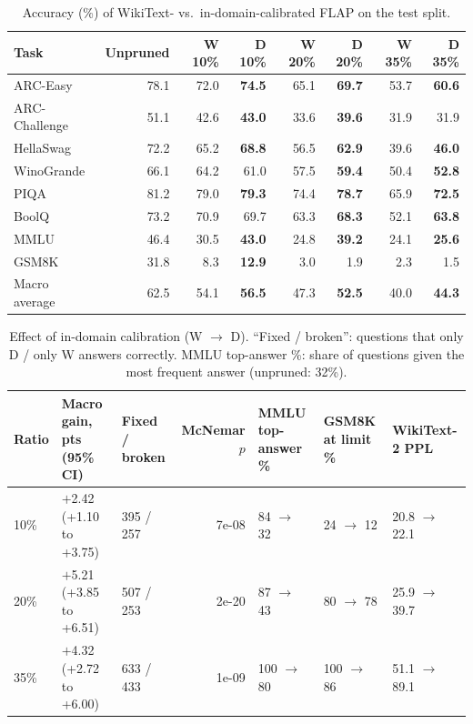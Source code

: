 \begin{table}[!htbp]\centering\small
\begin{tabular}{lrrrrrrr}
\toprule
Task & Unpruned & W 10\% & D 10\% & W 20\% & D 20\% & W 35\% & D 35\% \\
\midrule
ARC-Easy & 78.1 & 72.0 & \textbf{74.5} & 65.1 & \textbf{69.7} & 53.7 & \textbf{60.6} \\
ARC-Challenge & 51.1 & 42.6 & \textbf{43.0} & 33.6 & \textbf{39.6} & 31.9 & 31.9 \\
HellaSwag & 72.2 & 65.2 & \textbf{68.8} & 56.5 & \textbf{62.9} & 39.6 & \textbf{46.0} \\
WinoGrande & 66.1 & 64.2 & 61.0 & 57.5 & \textbf{59.4} & 50.4 & \textbf{52.8} \\
PIQA & 81.2 & 79.0 & \textbf{79.3} & 74.4 & \textbf{78.7} & 65.9 & \textbf{72.5} \\
BoolQ & 73.2 & 70.9 & 69.7 & 63.3 & \textbf{68.3} & 52.1 & \textbf{63.8} \\
MMLU & 46.4 & 30.5 & \textbf{43.0} & 24.8 & \textbf{39.2} & 24.1 & \textbf{25.6} \\
GSM8K & 31.8 & 8.3 & \textbf{12.9} & 3.0 & 1.9 & 2.3 & 1.5 \\
\midrule
Macro average & 62.5 & 54.1 & \textbf{56.5} & 47.3 & \textbf{52.5} & 40.0 & \textbf{44.3} \\
\bottomrule
\end{tabular}
\caption{Accuracy (\%) of WikiText- vs.\ in-domain-calibrated FLAP on the test split.}\label{tab:calib}
\end{table}

\begin{table}[!htbp]\centering\small
\begin{tabular}{lllrlll}
\toprule
Ratio & Macro gain, pts (95\% CI) & Fixed / broken & McNemar $p$ & MMLU top-answer \% & GSM8K at limit \% & WikiText-2 PPL \\
\midrule
10\% & $+$2.42 (+1.10 to +3.75) & 395 / 257 & 7e-08 & 84 $\to$ 32 & 24 $\to$ 12 & 20.8 $\to$ 22.1 \\
20\% & $+$5.21 (+3.85 to +6.51) & 507 / 253 & 2e-20 & 87 $\to$ 43 & 80 $\to$ 78 & 25.9 $\to$ 39.7 \\
35\% & $+$4.32 (+2.72 to +6.00) & 633 / 433 & 1e-09 & 100 $\to$ 80 & 100 $\to$ 86 & 51.1 $\to$ 89.1 \\
\bottomrule
\end{tabular}
\caption{Effect of in-domain calibration (W $\to$ D). ``Fixed / broken'': questions that only D / only W answers correctly. MMLU top-answer \%: share of questions given the most frequent answer (unpruned: 32\%).}\label{tab:calibsig}
\end{table}

